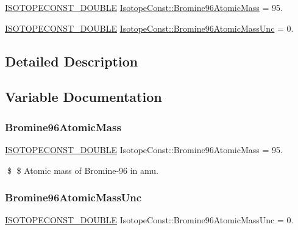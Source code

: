 \begin{DoxyCompactItemize}
\item 
\mbox{\hyperlink{group___isotope_const-_macros_ga8f45a7272ce02c0b4c65c44636ed719a}{I\+S\+O\+T\+O\+P\+E\+C\+O\+N\+S\+T\+\_\+\+D\+O\+U\+B\+LE}} \mbox{\hyperlink{group___isotope_const-_bromine-_br96_gacc5c29f834eac19b888ec96509de81cd}{Isotope\+Const\+::\+Bromine96\+Atomic\+Mass}} = 95.
\item 
\mbox{\hyperlink{group___isotope_const-_macros_ga8f45a7272ce02c0b4c65c44636ed719a}{I\+S\+O\+T\+O\+P\+E\+C\+O\+N\+S\+T\+\_\+\+D\+O\+U\+B\+LE}} \mbox{\hyperlink{group___isotope_const-_bromine-_br96_ga8dc14c2b5a0863da30163b03a059f567}{Isotope\+Const\+::\+Bromine96\+Atomic\+Mass\+Unc}} = 0.
\end{DoxyCompactItemize}


\subsection{Detailed Description}


\subsection{Variable Documentation}
\mbox{\label{group___isotope_const-_bromine-_br96_gacc5c29f834eac19b888ec96509de81cd}} 
\subsubsection{\texorpdfstring{Bromine96\+Atomic\+Mass}{Bromine96AtomicMass}}
{\footnotesize\ttfamily \mbox{\hyperlink{group___isotope_const-_macros_ga8f45a7272ce02c0b4c65c44636ed719a}{I\+S\+O\+T\+O\+P\+E\+C\+O\+N\+S\+T\+\_\+\+D\+O\+U\+B\+LE}} Isotope\+Const\+::\+Bromine96\+Atomic\+Mass = 95.}

\$ \$ Atomic mass of Bromine-\/96 in amu. \mbox{\label{group___isotope_const-_bromine-_br96_ga8dc14c2b5a0863da30163b03a059f567}} 
\subsubsection{\texorpdfstring{Bromine96\+Atomic\+Mass\+Unc}{Bromine96AtomicMassUnc}}
{\footnotesize\ttfamily \mbox{\hyperlink{group___isotope_const-_macros_ga8f45a7272ce02c0b4c65c44636ed719a}{I\+S\+O\+T\+O\+P\+E\+C\+O\+N\+S\+T\+\_\+\+D\+O\+U\+B\+LE}} Isotope\+Const\+::\+Bromine96\+Atomic\+Mass\+Unc = 0.}

